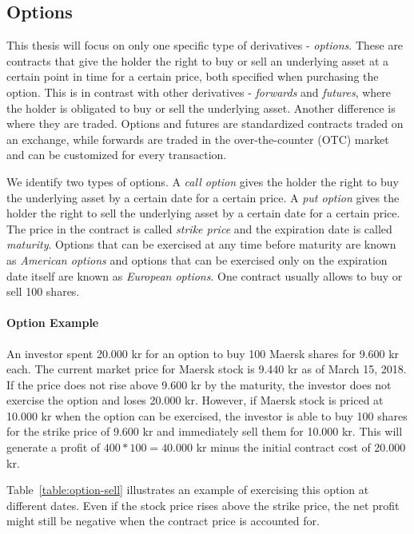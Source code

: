 \subsection{Options}
This thesis will focus on only one specific type of derivatives - \textit{options}. These are contracts that give the holder the right to buy or sell an underlying asset at a certain point in time for a certain price, both specified when purchasing the option. This is in contrast with other derivatives - \textit{forwards} and \textit{futures}, where the holder is obligated to buy or sell the underlying asset. Another difference is where they are traded. Options and futures are standardized contracts traded on an exchange, while forwards are traded in the over-the-counter (OTC) market and can be customized for every transaction.~\cite[pg.22]{ofod}

We identify two types of options. A \textit{call option} gives the holder the right to buy the underlying asset by a certain date for a certain price. A \textit{put option} gives the holder the right to sell the underlying asset by a certain date for a certain price. The price in the contract is called \textit{strike price} and the expiration date is called \textit{maturity}. Options that can be exercised at any time before maturity are known as \textit{American options} and options that can be exercised only on the expiration date itself are known as \textit{European options}. One contract usually allows to buy or sell 100 shares.~\cite[pg.7-8]{ofod}

\paragraph{Option Example}
An investor spent 20.000 kr for an option to buy 100 Maersk shares for 9.600 kr each. The current market price for Maersk stock is 9.440 kr as of March 15, 2018. If the price does not rise above 9.600 kr by the maturity, the investor does not exercise the option and loses 20.000 kr. However, if Maersk stock is priced at 10.000 kr when the option can be exercised, the investor is able to buy 100 shares for the strike price of 9.600 kr and immediately sell them for 10.000 kr. This will generate a profit of $400 * 100 = 40.000$ kr minus the initial contract cost of 20.000 kr.

Table~\ref{table:option-sell} illustrates an example of exercising this option at different dates. Even if the stock price rises above the strike price, the net profit might still be negative when the contract price is accounted for.  

